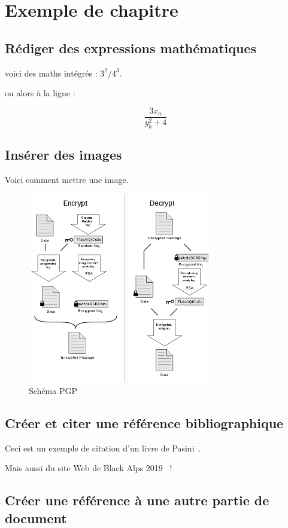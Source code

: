 \chapter{Exemple de chapitre}

\lipsum[1]


\section{Rédiger des expressions mathématiques}

voici des maths intégrés : $3^2 / 4^3$.

ou alors à la ligne :

$$ \frac{3 x_a}{ y_b^2 +4}$$

\section{Insérer des images}

Voici comment mettre une image.

\begin{figure}
	\centering
	\includegraphics[width=8cm]{images/PGP_101.png}
	\caption{Schéma PGP}
	\label{fig:pgp}
\end{figure}


\section{Créer et citer une référence bibliographique}

Ceci est un exemple de citation d'un livre de Pasini~\cite{pasini2015}.

Mais aussi du site Web de Black Alps 2019~\cite{BA19} !


\section{Créer une référence à une autre partie de document}

